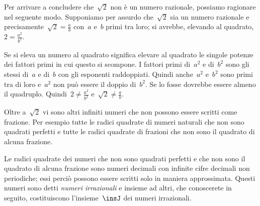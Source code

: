 Per arrivare a concludere che~$\sqrt{2}$ non è un numero razionale,
possiamo ragionare nel seguente modo. Supponiamo per assurdo che~$\sqrt{2}$
sia un numero razionale e precisamente~$\sqrt{2}=\frac{a}{b}$ con~$a$ e~$b$ 
primi tra loro; si avrebbe, elevando al quadrato, $2=\frac{a^{2}}{b^{2}}$.

Se si eleva un numero al quadrato significa elevare al quadrato le
singole potenze dei fattori primi in cui questo si scompone. I fattori
primi di~$a^{2}$ e di~$b^{2}$ sono gli stessi di~$a$ e di~$b$ con
gli esponenti raddoppiati. Quindi anche~$a^{2}$ e~$b^{2}$
sono primi tra di loro e~$a^{2}$ non può essere il doppio di~$b^{2}$.
Se lo fosse dovrebbe essere almeno il quadruplo. 
Quindi~$2\ne\frac{a^{2}}{b^{2}}$ e~$\sqrt{2}\ne\frac{a}{b}$.

Oltre a~$\sqrt{2}$ vi sono altri infiniti numeri che non possono
essere scritti come frazione. Per esempio tutte le radici quadrate di
numeri naturali che non sono quadrati perfetti e tutte le radici
quadrate di frazioni che non sono il quadrato di alcuna frazione.

Le radici quadrate dei numeri che non sono quadrati perfetti e che non
sono il quadrato di alcuna frazione sono numeri decimali con infinite 
cifre decimali non periodiche; essi perciò possono essere scritti
solo in maniera approssimata. Questi numeri sono detti 
\emph{numeri irrazionali} e insieme ad altri, che conoscerete
in seguito, costituiscono l'insieme~$\insJ$ dei numeri irrazionali.

